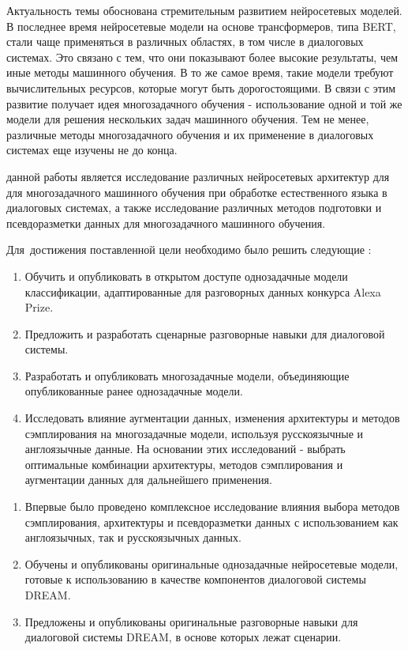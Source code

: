 
{\actuality} 
Актуальность темы обоснована стремительным развитием нейросетевых моделей. В последнее время нейросетевые модели на основе трансформеров, типа BERT, стали чаще применяться в различных областях, в том числе в диалоговых системах. Это связано с тем, что они показывают более высокие результаты, чем иные методы машинного обучения. В то же самое время, такие модели требуют вычислительных ресурсов, которые могут быть дорогостоящими. В связи с этим развитие получает идея многозадачного обучения - использование одной и той же модели для решения нескольких задач машинного обучения. Тем не менее, различные методы многозадачного обучения и их применение в диалоговых системах еще изучены не до конца.


{\aim} данной работы является исследование различных нейросетевых архитектур для  для многозадачного машинного обучения при обработке естественного языка в диалоговых системах, а также исследование различных методов подготовки и псевдоразметки данных для многозадачного машинного обучения. 

Для~достижения поставленной цели необходимо было решить следующие {\tasks}:
\begin{enumerate}
  \item Обучить и опубликовать в открытом доступе однозадачные модели классификации, адаптированные для разговорных данных конкурса Alexa Prize.
  \item Предложить и разработать сценарные разговорные навыки для
диалоговой системы.
  \item Разработать и опубликовать многозадачные модели, объединяющие опубликованные ранее однозадачные модели.
  \item Исследовать влияние аугментации данных, изменения архитектуры и методов сэмплирования на многозадачные модели, используя русскоязычные и англоязычные данные. На основании этих исследований - выбрать оптимальные комбинации архитектуры, методов сэмплирования и аугментации данных для дальнейшего применения. \newline
  \newline
  \newline
\end{enumerate}


{\novelty}
\begin{enumerate}
  \item Впервые было проведено комплексное исследование влияния выбора методов сэмплирования, архитектуры и псевдоразметки данных с использованием как англоязычных, так и русскоязычных данных. 
  \item Обучены и опубликованы оригинальные однозадачные нейросетевые модели, готовые к использованию в качестве компонентов диалоговой системы DREAM.
  \item Предложены и опубликованы оригинальные разговорные навыки для диалоговой системы DREAM,
в основе которых лежат сценарии. 
\end{enumerate}

